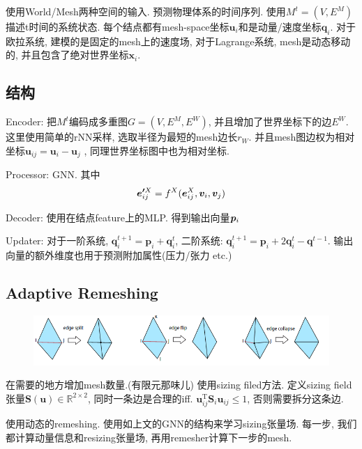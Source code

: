 \documentclass{article}
\begin{document}
使用World/Mesh两种空间的输入. 预测物理体系的时间序列. 使用$M^t=(V, E^M)$描述t时间的系统状态. 每个结点都有mesh-space坐标$\bm u_i$和是动量/速度坐标$\bm q_i$. 对于欧拉系统, 建模的是固定的mesh上的速度场, 对于Lagrange系统, mesh是动态移动的, 并且包含了绝对世界坐标$\bm x_i$. 

\subsection{结构}

Encoder: 把$M^t$编码成多重图$G=(V,E^M, E^W)$, 并且增加了世界坐标下的边$E^W$. 这里使用简单的rNN采样, 选取半径为最短的mesh边长$r_W$. 并且mesh图边权为相对坐标$\mathbf{u}_{i j}=\mathbf{u}_{i}-\mathbf{u}_{j}$ , 同理世界坐标图中也为相对坐标. 

Processor: GNN. 其中
\begin{align}
    \boldsymbol{e'}^{X}_{ij}=f^X(\boldsymbol{e}^{X}_{ij}, \boldsymbol{v}_i, \boldsymbol{v}_j)
\end{align}

Decoder: 使用在结点feature上的MLP. 得到输出向量$\boldsymbol{p}_i$

Updater: 对于一阶系统, $\mathbf{q}_{i}^{t+1}=\mathbf{p}_{i}+\mathbf{q}_{i}^{t}$, 二阶系统: $\mathbf{q}_{i}^{t+1}=\mathbf{p}_{i}+2 \mathbf{q}_{i}^{t}-\mathbf{q}^{t-1}$. 输出向量的额外维度也用于预测附加属性(压力/张力 etc.)

\subsection{Adaptive Remeshing}
\begin{figure}[htbp]
    \centering
    \includegraphics[width=\textwidth]{sizing.png}
\end{figure}
在需要的地方增加mesh数量.(有限元那味儿) 使用sizing filed方法. 定义sizing field张量$\mathbf{S}(\mathbf{u}) \in \mathbb{R}^{2 \times 2}$, 同时一条边是合理的iff. $\mathbf{u}_{i j}^{\mathrm{T}} \mathbf{S}_{i} \mathbf{u}_{i j} \leq 1$, 否则需要拆分这条边.

使用动态的remeshing. 使用如上文的GNN的结构来学习sizing张量场. 每一步, 我们都计算动量信息和resizing张量场, 再用remesher计算下一步的mesh.
\end{document}
